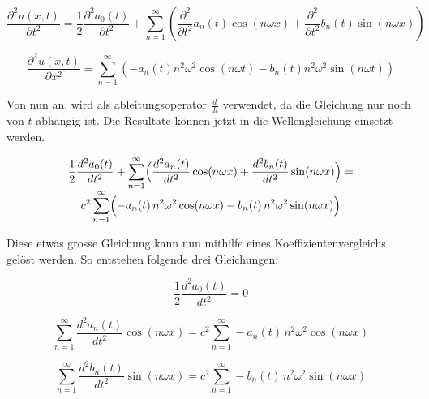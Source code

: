 \begin{equation}
	\frac{\partial^2 u(x,t)}{\partial t^2} = \frac{1}{2} \frac{\partial^2 a_0(t)}{\partial t^2} +  \sum_{n=1}^{\infty} \left( \frac{\partial^2}{\partial t^2} a_n(t) \cos(n \omega x) + \frac{\partial^2}{\partial t^2} b_n(t) \sin(n \omega x) \right)
\end{equation}

\begin{equation}
	\frac{\partial^2 u(x,t)}{\partial x^2} = \sum_{n=1}^{\infty} \left( -a_n(t) n^2 \omega^2 \cos(n \omega t) - b_n(t) n^2 \omega^2 \sin(n \omega t) \right)
\end{equation}


Von nun an, wird als ableitungsoperator $\frac{d}{dt}$ verwendet, da die Gleichung nur noch von $t$ abhängig ist.
Die Resultate können jetzt in die Wellengleichung einsetzt werden. 



\begin{multline}
	\frac{1}{2}\frac{d^2 a_0(t)}{dt^2}
	+ \sum_{n=1}^{\infty}\Bigl(
	\frac{d^2 a_n(t)}{dt^2}\cos(n\omega x)
	+ \frac{d^2 b_n(t)}{dt^2}\sin(n\omega x)
	\Bigr)
	= \\[-0.8ex]
	c^2 \sum_{n=1}^{\infty}\Bigl(
	-a_n(t)\,n^2\omega^2\cos(n\omega x)
	-b_n(t)\,n^2\omega^2\sin(n\omega x)
	\Bigr)
\end{multline}


Diese etwas grosse Gleichung kann nun mithilfe eines Koeffizientenvergleichs gelöst werden.
So entstehen folgende drei Gleichungen:

\begin{equation}
	\frac{1}{2} \frac{d^2 a_0(t)}{d t^2} = 0
\end{equation}

\begin{equation}
	\sum_{n=1}^{\infty}
	\frac{d^2 a_n(t)}{dt^2}\cos(n\omega x)
	 = c^2 \sum_{n=1}^{\infty}
	-a_n(t)\,n^2\omega^2\cos(n\omega x)
	\end{equation}

\begin{equation}
	\sum_{n=1}^{\infty}
	\frac{d^2 b_n(t)}{dt^2}\sin(n\omega x) = c^2 \sum_{n=1}^{\infty}
	-b_n(t)\,n^2\omega^2\sin(n\omega x)
\end{equation}

